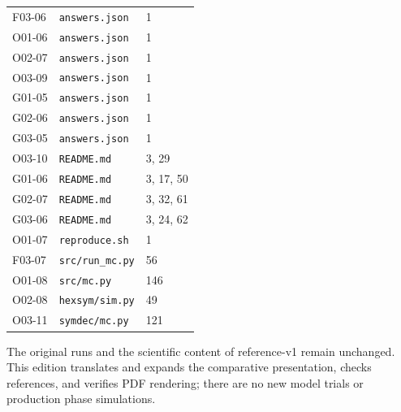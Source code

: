 \documentclass[11pt,a4paper]{article}
\begin{document}
{\begin{longtable}
{}\label{src:F03-06}F03-06 & \nolinkurl{answers.json} & 1\tabularnewline
{}\label{src:O01-06}O01-06 & \nolinkurl{answers.json} & 1\tabularnewline
{}\label{src:O02-07}O02-07 & \nolinkurl{answers.json} & 1\tabularnewline
{}\label{src:O03-09}O03-09 & \nolinkurl{answers.json} & 1\tabularnewline
{}\label{src:G01-05}G01-05 & \nolinkurl{answers.json} & 1\tabularnewline
{}\label{src:G02-06}G02-06 & \nolinkurl{answers.json} & 1\tabularnewline
{}\label{src:G03-05}G03-05 & \nolinkurl{answers.json} & 1\tabularnewline
{}\label{src:O03-10}O03-10 & \nolinkurl{README.md} & 3,\allowbreak{} 29\tabularnewline
{}\label{src:G01-06}G01-06 & \nolinkurl{README.md} & 3,\allowbreak{} 17,\allowbreak{} 50\tabularnewline
{}\label{src:G02-07}G02-07 & \nolinkurl{README.md} & 3,\allowbreak{} 32,\allowbreak{} 61\tabularnewline
{}\label{src:G03-06}G03-06 & \nolinkurl{README.md} & 3,\allowbreak{} 24,\allowbreak{} 62\tabularnewline
{}\label{src:O01-07}O01-07 & \nolinkurl{reproduce.sh} & 1\tabularnewline
{}\label{src:F03-07}F03-07 & \nolinkurl{src/run_mc.py} & 56\tabularnewline
{}\label{src:O01-08}O01-08 & \nolinkurl{src/mc.py} & 146\tabularnewline
{}\label{src:O02-08}O02-08 & \nolinkurl{hexsym/sim.py} & 49\tabularnewline
{}\label{src:O03-11}O03-11 & \nolinkurl{symdec/mc.py} & 121\tabularnewline
\bottomrule
\end{longtable}
}
The original runs and the scientific content of reference-v1 remain unchanged. This edition translates and expands the comparative presentation,\allowbreak{} checks references,\allowbreak{} and verifies PDF rendering; there are no new model trials or production phase simulations.
\end{document}
